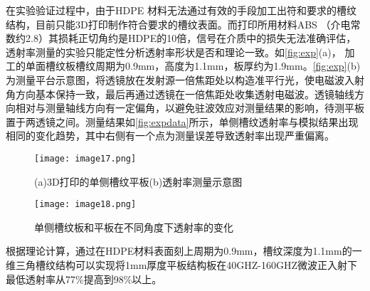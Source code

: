 在实验验证过程中，由于HDPE 材料无法通过有效的手段加工出符和要求的槽纹结构，目前只能3D打印制作符合要求的槽纹表面。而打印所用材料ABS （介电常数约2.8\cite{RN2062}）其损耗正切角约是HDPE的10倍\cite{RN2061}，信号在介质中的损失无法准确评估，透射率测量的实验只能定性分析透射率形状是否和理论一致。如\autoref{fig:exp}(a)， 加工的单面槽纹板槽纹周期为0.9mm，高度为1.1mm，板厚约为1.9mm。\autoref{fig:exp}(b)为测量平台示意图，将透镜放在发射源一倍焦距处以构造准平行光，使电磁波入射角方向基本保持一致，最后再通过透镜在一倍焦距处收集透射电磁波。透镜轴线方向相对与测量轴线方向有一定偏角，以避免驻波效应对测量结果的影响，待测平板置于两透镜之间。测量结果如\autoref{fig:expdata}所示，单侧槽纹透射率与模拟结果出现相同的变化趋势，其中右侧有一个点为测量误差导致透射率出现严重偏离。



\begin{figure}[ht]
\centering
\texttt{[image: image17.png]}
\caption{\label{fig:exp}(a)3D打印的单侧槽纹平板(b)透射率测量示意图}
\end{figure}

\begin{figure}[ht]
\centering
\texttt{[image: image18.png]}
\caption{\label{fig:expdata}单侧槽纹板和平板在不同角度下透射率的变化}
\end{figure}

根据理论计算，通过在HDPE材料表面刻上周期为0.9mm，槽纹深度为1.1mm的一维三角槽纹结构可以实现将1mm厚度平板结构板在40GHZ-160GHZ微波正入射下最低透射率从77\%提高到98\%以上。

